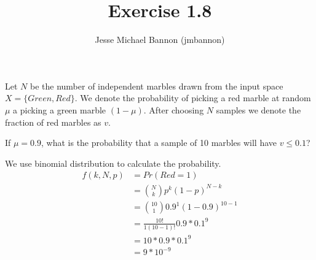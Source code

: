 \documentclass{article}
\author{Jesse Michael Bannon (jmbannon)}
\title{Exercise 1.8}
\begin{document}
\maketitle

Let $N$ be the number of independent marbles drawn from the input space $X = \{Green, Red\}$. We denote the probability of picking a red marble at random $\mu$ a picking a green marble $(1 - \mu)$. After choosing $N$ samples we denote the fraction of red marbles as $v$.

\smallskip

If $\mu = 0.9$, what is the probability that a sample of 10 marbles will have $v \le 0.1$?

\medskip

We use binomial distribution to calculate the probability.
\begin{align*}
f(k, N, p)&=Pr(Red = 1) \\
          &=\binom{N}{k} p^k(1-p)^{N-k} \\
          &=\binom{10}{1}0.9^{1}(1 - 0.9)^{10-1} \\
          &=\frac{10!}{1(10-1)!}0.9 * 0.1^9 \\
          &=10 * 0.9 * 0.1^9 \\
          &=9 * 10^{-9}
\end{align*}
\end{document}
